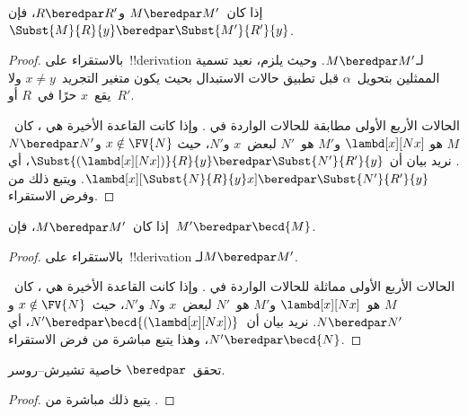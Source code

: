 \documentclass[../../../include/open-logic-section]{subfiles}
\begin{document}
\begin{lem}
  إذا كان~$M \beredpar M'$ و$R \beredpar R'$، فإن~$\Subst{M}{R}{y}
  \beredpar \Subst{M'}{R'}{y}$.
\end{lem}

\begin{proof}
  بالاستقراء على~!!{derivation} لـ$M \beredpar M'$. وحيث يلزم، نعيد
  تسمية الممثلين بتحويل~$\alpha$ قبل تطبيق حالات الاستبدال بحيث يكون
  متغير التجريد~$x \ne y$ ولا يقع~$x$ حرًا في~$R$ أو~$R'$.

  الحالات الأربع الأولى مطابقة للحالات الواردة في .
  وإذا كانت القاعدة الأخيرة هي ، كان~$M$ هو
  $\lambd[x][Nx]$ و$M'$ هو~$N'$ لبعض~$x$ و$N'$، حيث
  $x \notin \FV{N}$ و$N \beredpar N'$. نريد بيان أن
  $\Subst{(\lambd[x][Nx])}{R}{y} \beredpar \Subst{N'}{R'}{y}$، أي
  $\lambd[x][\Subst{N}{R}{y} x] \beredpar \Subst{N'}{R'}{y}$.
  ويتبع ذلك من  وفرض
  الاستقراء.
\end{proof}

\begin{lem}
  إذا كان~$M \beredpar M'$، فإن~$M' \beredpar \becd{M}$.
\end{lem}

\begin{proof}
  بالاستقراء على~!!{derivation} لـ$M \beredpar M'$.

  الحالات الأربع الأولى مماثلة للحالات الواردة في
  . وإذا كانت القاعدة الأخيرة هي
  ، كان~$M$ هو~$\lambd[x][Nx]$ و$M'$ هو~$N'$
  لبعض~$x$ و$N$ و$N'$، حيث~$x \notin \FV{N}$ و$N \beredpar N'$.
  نريد بيان أن~$N' \beredpar \becd{(\lambd[x][Nx])}$، أي
  $N' \beredpar \becd{N}$، وهذا يتبع مباشرة من فرض الاستقراء.
\end{proof}

\begin{thm}
  تحقق~$\beredpar$ خاصية تشيرش--روسر.
\end{thm}

\begin{proof}
  يتبع ذلك مباشرة من .
\end{proof}
\end{document}

